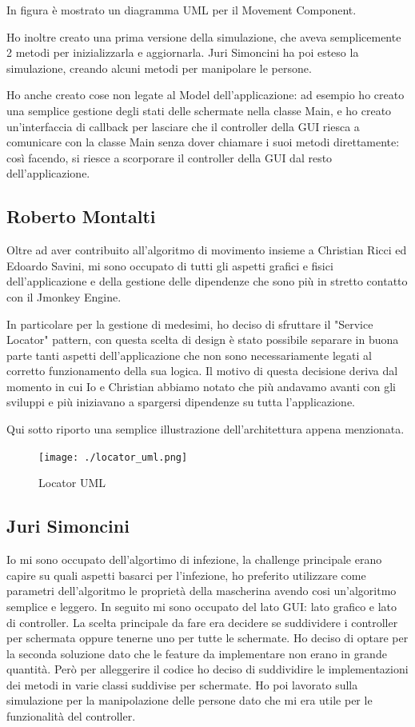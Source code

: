 In figura è mostrato un diagramma UML per il Movement Component.

Ho inoltre creato una prima versione della simulazione, che aveva semplicemente 2 metodi per inizializzarla e aggiornarla. Juri Simoncini ha poi esteso la simulazione, creando alcuni metodi per manipolare le persone.

Ho anche creato cose non legate al Model dell'applicazione: ad esempio ho creato una semplice gestione degli stati delle schermate nella classe Main, e ho creato un'interfaccia di callback per lasciare che il controller della GUI riesca a comunicare con la classe Main senza dover chiamare i suoi metodi direttamente: così facendo, si riesce a scorporare il controller della GUI dal resto dell'applicazione.

\subsection{Roberto Montalti}

Oltre ad aver contribuito all'algoritmo di movimento insieme a Christian Ricci ed Edoardo Savini, mi sono occupato di tutti gli aspetti grafici e fisici dell'applicazione e della gestione delle dipendenze che sono più in stretto contatto con il Jmonkey Engine.

In particolare per la gestione di medesimi, ho deciso di sfruttare il "Service Locator" pattern, con questa scelta di design è stato possibile separare in buona parte tanti aspetti dell'applicazione che non sono necessariamente legati al corretto funzionamento della sua logica.
Il motivo di questa decisione deriva dal momento in cui Io e Christian abbiamo notato che più andavamo avanti con gli sviluppi e più iniziavano a spargersi dipendenze su tutta l'applicazione.

Qui sotto riporto una semplice illustrazione dell'architettura appena menzionata.

\begin{figure}[h]
\centering{}
\texttt{[image: ./locator\_uml.png]}
\caption{Locator UML}
\label{img:Locator UML}
\end{figure}

\subsection{Juri Simoncini}
Io mi sono occupato dell'algortimo di infezione, la challenge principale erano capire su quali aspetti basarci per l'infezione, 
ho preferito utilizzare come parametri dell'algoritmo le proprietà della mascherina avendo cosi un'algoritmo semplice e leggero.
In seguito mi sono occupato del lato GUI: lato grafico e lato di controller.
La scelta principale da fare era decidere se suddividere i controller per schermata oppure tenerne uno per tutte le schermate.
Ho deciso di optare per la seconda soluzione dato che le feature da implementare non erano in grande quantità.
Però per alleggerire il codice ho deciso di suddividire le implementazioni dei metodi in varie classi suddivise per schermate.
Ho poi lavorato sulla simulazione per la manipolazione delle persone dato che mi era utile per le funzionalità del controller.

